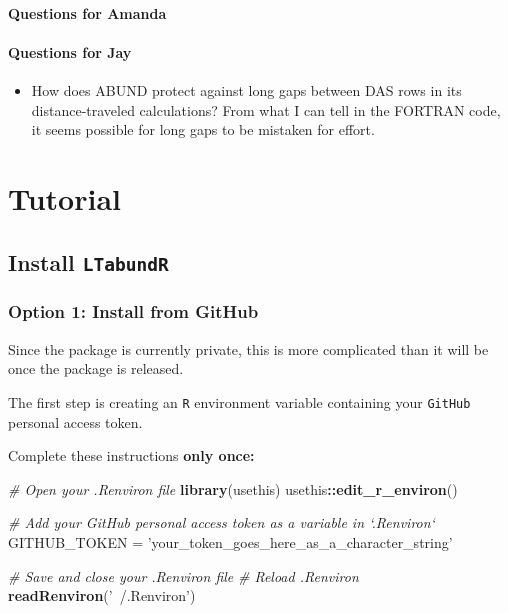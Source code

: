 \documentclass[
]{book}
\newenvironment{Shaded}{\begin{snugshade}}{\end{snugshade}}
\newcommand{\CommentTok}[1]{\textcolor[rgb]{0.56,0.35,0.01}{\textit{#1}}}
\newcommand{\KeywordTok}[1]{\textcolor[rgb]{0.13,0.29,0.53}{\textbf{#1}}}
\newcommand{\NormalTok}[1]{#1}
\newcommand{\OperatorTok}[1]{\textcolor[rgb]{0.81,0.36,0.00}{\textbf{#1}}}
\newcommand{\StringTok}[1]{\textcolor[rgb]{0.31,0.60,0.02}{#1}}
\providecommand{\tightlist}{%
  \setlength{\itemsep}{0pt}\setlength{\parskip}{0pt}}
\begin{document}
\hypertarget{questions-for-amanda}{%
\subsection*{Questions for Amanda}\label{questions-for-amanda}}

\hypertarget{questions-for-jay}{%
\subsection*{Questions for Jay}\label{questions-for-jay}}

\begin{itemize}
\tightlist
\item
  How does ABUND protect against long gaps between DAS rows in its distance-traveled calculations? From what I can tell in the FORTRAN code, it seems possible for long gaps to be mistaken for effort.
\end{itemize}

\hypertarget{part-tutorial}{%
\part{Tutorial}\label{part-tutorial}}

\hypertarget{install}{%
\chapter{\texorpdfstring{Install \texttt{LTabundR}}{Install LTabundR}}\label{install}}

\hypertarget{option-1-install-from-github}{%
\section*{Option 1: Install from GitHub}\label{option-1-install-from-github}}

Since the package is currently private, this is more complicated than it will be once the package is released.

The first step is creating an \texttt{R} environment variable containing your \texttt{GitHub} personal access token.

Complete these instructions \textbf{only once:}

\begin{Shaded}
\begin{Highlighting}[]
\CommentTok{# Open your .Renviron file}
\KeywordTok{library}\NormalTok{(usethis)}
\NormalTok{usethis}\OperatorTok{::}\KeywordTok{edit_r_environ}\NormalTok{()}

\CommentTok{# Add your GitHub personal access token as a variable in `.Renviron`}
\NormalTok{GITHUB_TOKEN =}\StringTok{ 'your_token_goes_here_as_a_character_string'}

\CommentTok{# Save and close your .Renviron file}
\CommentTok{# Reload .Renviron}
\KeywordTok{readRenviron}\NormalTok{(}\StringTok{'~/.Renviron'}\NormalTok{)}
\end{Highlighting}
\end{Shaded}
\end{document}
